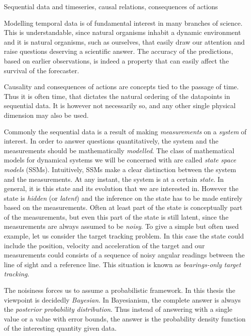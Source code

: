 Sequential data and timeseries, causal relations, consequences of actions

Modelling temporal data is of fundamental interest in many branches of science.
This is understandable, since natural organisms inhabit a dynamic environment and
it is natural organisms, such as ourselves, that easily draw our attention and raise questions
deserving a scientific answer. The accuracy of the predictions, based on earlier observations,
is indeed a property that can easily affect the survival of the forecaster.  

Causality and consequences of actions are concepts tied to the passage of time.
Thus it is often time, that dictates the natural ordering of the datapoints
in sequential data. It is however not necessarily so, and any other single
physical dimension may also be used.

Commonly the sequential data is a result of making \emph{measurements} on a
\emph{system} of interest. In order to answer questions quantitatively,
the system and the measurements should be mathematically \emph{modelled}. The class of mathematical
models for dynamical systems we will be concerned with are called \emph{state space models} (SSMs).
Intuitively, SSMs make a clear distinction between the system and the measurements. At any instant,
the system is at a certain \emph{state}. In general, it is this state and its evolution that we are interested in.
However the state is \emph{hidden} (or \emph{latent}) and the inference on the state has to be made entirely
based on the measurements.  Often at least part of the state is conceptually part of the measurements,
but even this part of the state is still latent, since the measurements are always assumed to be \emph{noisy}.
To give a simple but often used example, let us consider the target tracking problem. In this case the state
could include the position, velocity and acceleration of the target and our measurements could consists
of a sequence of noisy angular readings between the line of sight and a reference line. This situation is
known as \emph{bearings-only target tracking}.

The noisiness forces us to assume a probabilistic framework. In this thesis the viewpoint
is decidedly \emph{Bayesian}. In Bayesianism, the complete answer
is always the \emph{posterior probability distribution}. Thus instead of answering
with a single value or a value with error bounds, the answer is the probability
density function of the interesting quantity given data.

